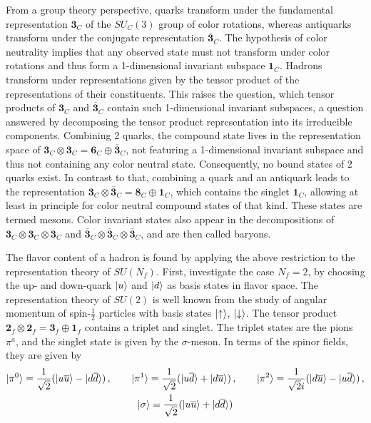 From a group theory perspective, quarks transform under the fundamental representation $\mathbf{3}_C$ of the $SU_C(3)$ group of color rotations, whereas antiquarks transform under the conjugate representation $\overline{\mathbf{3}}_C$. The hypothesis of color neutrality implies that any observed state must not transform under color rotations and thus form a 1-dimensional invariant subspace $\mathbf{1}_C$. Hadrons transform under representations given by the tensor product of the representations of their constituents. This raises the question, which tensor products of $\mathbf{3}_C$ and $\overline{\mathbf{3}}_C$ contain such 1-dimensional invariant subspaces, a question answered by decomposing the tensor product representation into its irreducible components. Combining 2 quarks, the compound state lives in the representation space of ${\mathbf{3}_C\otimes\mathbf{3}_C=\mathbf{6}_C\oplus\overline{\mathbf{3}}_C}$, not featuring a 1-dimensional invariant subspace and thus not containing any color neutral state. Consequently, no bound states of 2 quarks exist. In contrast to that, combining a quark and an antiquark leads to the representation ${\mathbf{3}_C\otimes\overline{\mathbf{3}}_C=\mathbf{8}_C\oplus\mathbf{1}_C}$, which contains the singlet $\mathbf{1}_C$, allowing at least in principle for color neutral compound states of that kind. These states are termed mesons. Color invariant states also appear in the decompositions of ${\mathbf{3}_C\otimes \mathbf{3}_C\otimes \mathbf{3}_C}$ and ${\overline{\mathbf{3}}_C\otimes \overline{\mathbf{3}}_C\otimes \overline{\mathbf{3}}_C}$, and are then called baryons.

The flavor content of a hadron is found by applying the above restriction to the representation theory of $SU(N_f)$. First, investigate the case ${N_f=2}$, by choosing the up- and down-quark ${\lvert u\rangle}$ and ${\lvert d\rangle}$ as basis states in flavor space. The representation theory of $SU(2)$ is well known from the study of angular momentum of spin-$\frac{1}{2}$ particles with basis states ${\lvert\uparrow\rangle}$, ${\lvert\downarrow\rangle}$. The tensor product ${\mathbf{2}_f\otimes\mathbf{2}_f=\mathbf{3}_f\oplus\mathbf{1}_f}$ contains a triplet and singlet. The triplet states are the pions $\pi^a$, and the singlet state is given by the $\sigma$-meson. In terms of the spinor fields, they are given by 
\begin{gather}
    {\lvert\pi^0\rangle}=\frac{1}{\sqrt{2}}({\lvert u\overline{u}\rangle}-{\lvert d\overline{d}\rangle})\,,\qquad{\lvert\pi^1\rangle}=\frac{1}{\sqrt{2}}({\lvert u\overline{d}\rangle}+{\lvert d\overline{u}\rangle})\,,\qquad{\lvert\pi^2\rangle}=\frac{1}{\sqrt{2}{i}}({\lvert d\overline{u}\rangle}-{\lvert u\overline{d}\rangle})\,,\\
    {\lvert\sigma\rangle}=\frac{1}{\sqrt{2}}({\lvert u\overline{u}\rangle}+{\lvert d\overline{d}\rangle})
\end{gather}

